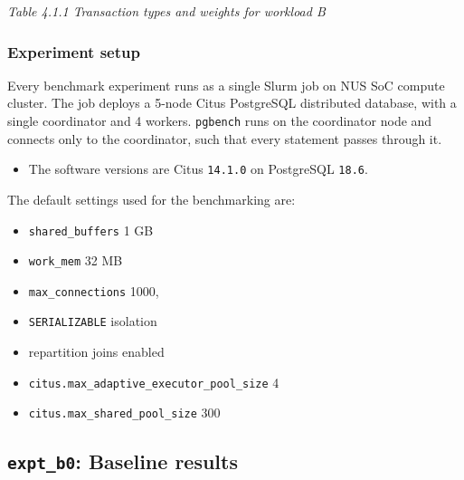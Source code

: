 {\itshape Table 4.1.1 Transaction types and weights for workload B}\par
{}\subsubsection*{Experiment setup}
Every benchmark experiment runs as a single Slurm job on NUS SoC compute cluster. The job deploys a 5-node Citus PostgreSQL distributed database, with a single coordinator and 4 workers. \texttt{pgbench} runs on the coordinator node and connects only to the coordinator, such that every statement passes through it.\par
\begin{itemize}
\item The software versions are Citus \texttt{14.1.0} on PostgreSQL \texttt{18.6}.
\end{itemize}
The default settings used for the benchmarking are:\par
\begin{itemize}
\item \texttt{shared\_\allowbreak{}buffers} 1 GB
\item \texttt{work\_\allowbreak{}mem} 32 MB
\item \texttt{max\_\allowbreak{}connections} 1000,
\item \texttt{SERIALIZABLE} isolation
\item repartition joins enabled
\item \texttt{citus.max\_\allowbreak{}adaptive\_\allowbreak{}executor\_\allowbreak{}pool\_\allowbreak{}size} 4
\item \texttt{citus.max\_\allowbreak{}shared\_\allowbreak{}pool\_\allowbreak{}size} 300
\end{itemize}
\subsection{\texttt{expt\_b0}: Baseline results}
